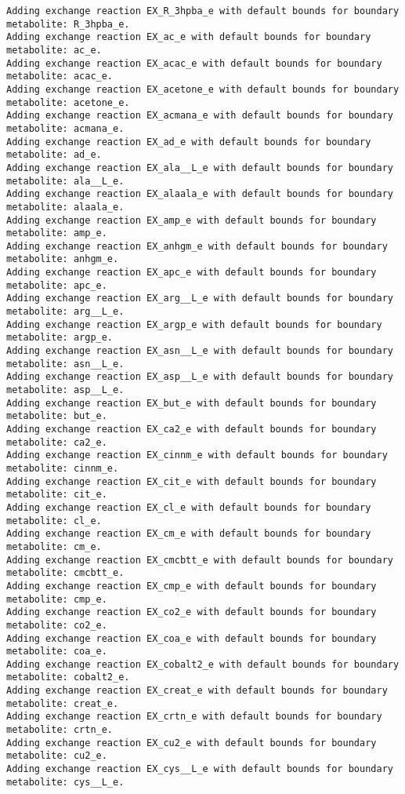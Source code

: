 \documentclass[
  letterpaper,
  DIV=11,
  numbers=noendperiod]{scrartcl}
\begin{document}
\begin{verbatim}
Adding exchange reaction EX_R_3hpba_e with default bounds for boundary metabolite: R_3hpba_e.
Adding exchange reaction EX_ac_e with default bounds for boundary metabolite: ac_e.
Adding exchange reaction EX_acac_e with default bounds for boundary metabolite: acac_e.
Adding exchange reaction EX_acetone_e with default bounds for boundary metabolite: acetone_e.
Adding exchange reaction EX_acmana_e with default bounds for boundary metabolite: acmana_e.
Adding exchange reaction EX_ad_e with default bounds for boundary metabolite: ad_e.
Adding exchange reaction EX_ala__L_e with default bounds for boundary metabolite: ala__L_e.
Adding exchange reaction EX_alaala_e with default bounds for boundary metabolite: alaala_e.
Adding exchange reaction EX_amp_e with default bounds for boundary metabolite: amp_e.
Adding exchange reaction EX_anhgm_e with default bounds for boundary metabolite: anhgm_e.
Adding exchange reaction EX_apc_e with default bounds for boundary metabolite: apc_e.
Adding exchange reaction EX_arg__L_e with default bounds for boundary metabolite: arg__L_e.
Adding exchange reaction EX_argp_e with default bounds for boundary metabolite: argp_e.
Adding exchange reaction EX_asn__L_e with default bounds for boundary metabolite: asn__L_e.
Adding exchange reaction EX_asp__L_e with default bounds for boundary metabolite: asp__L_e.
Adding exchange reaction EX_but_e with default bounds for boundary metabolite: but_e.
Adding exchange reaction EX_ca2_e with default bounds for boundary metabolite: ca2_e.
Adding exchange reaction EX_cinnm_e with default bounds for boundary metabolite: cinnm_e.
Adding exchange reaction EX_cit_e with default bounds for boundary metabolite: cit_e.
Adding exchange reaction EX_cl_e with default bounds for boundary metabolite: cl_e.
Adding exchange reaction EX_cm_e with default bounds for boundary metabolite: cm_e.
Adding exchange reaction EX_cmcbtt_e with default bounds for boundary metabolite: cmcbtt_e.
Adding exchange reaction EX_cmp_e with default bounds for boundary metabolite: cmp_e.
Adding exchange reaction EX_co2_e with default bounds for boundary metabolite: co2_e.
Adding exchange reaction EX_coa_e with default bounds for boundary metabolite: coa_e.
Adding exchange reaction EX_cobalt2_e with default bounds for boundary metabolite: cobalt2_e.
Adding exchange reaction EX_creat_e with default bounds for boundary metabolite: creat_e.
Adding exchange reaction EX_crtn_e with default bounds for boundary metabolite: crtn_e.
Adding exchange reaction EX_cu2_e with default bounds for boundary metabolite: cu2_e.
Adding exchange reaction EX_cys__L_e with default bounds for boundary metabolite: cys__L_e.

\end{verbatim}
\end{document}
